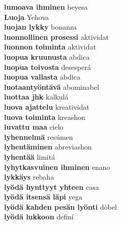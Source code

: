 \textbf{ lumoava ihminen  } beyesa \\
\textbf{ Luoja  } Yehova \\
\textbf{ luojan lykky  } bonanza \\
\textbf{ luonnollinen prosessi  } aktividat \\
\textbf{ luonnon toiminta  } aktividat \\
\textbf{ luopua kruunusta  } abdica \\
\textbf{ luopua toivosta  } desesperá \\
\textbf{ luopua vallasta  } abdica \\
\textbf{ luotaantyöntävä  } abominabel \\
\textbf{ luottaa jhk  } kalkulá \\
\textbf{ luova ajattelu  } kreatividat \\
\textbf{ luova toiminta  } kreashon \\
\textbf{ luvattu maa  } cielo \\
\textbf{ lyhennelmä  } resúmen \\
\textbf{ lyhentäminen  } abreviashon \\
\textbf{ lyhentää  } limitá \\
\textbf{ lyhytkasvuinen ihminen  } enano \\
\textbf{ lykkäys  } rebaha \\
\textbf{ lyödä hynttyyt yhteen  } casa \\
\textbf{ lyödä itsensä läpi  } yega \\
\textbf{ lyödä kahden pesän lyönti  } dòbel \\
\textbf{ lyödä lukkoon  } definí \\
